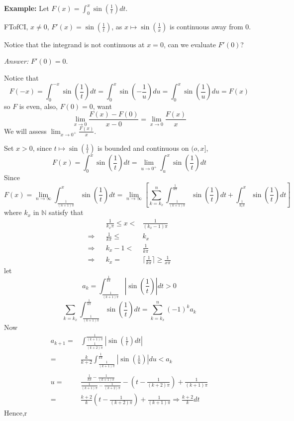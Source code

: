 \documentclass[12pt]{article}
\theoremstyle{plain}
\newcommand{\abs}[1]{\left| #1 \right|}
\newcommand{\ceil}[1]{\lceil #1 \rceil}
\newcommand{\mN}{{\mathbb{N}}}
\begin{document}
{\color{Brown}
\textbf{Example: }
Let $F(x) = \int_0^x \sin(\frac 1t) dt$.

FTofCI, $x \neq 0$, $F'(x) = \sin(\frac 1t)$, as $x\mapsto \sin(\frac 1x)$ is 
continuous away from $0$. 

Notice that the integrand is not continuous at $x = 0$, can we evaluate
$F'(0)$?  

\textit{Answer:} $F'(0) = 0$. 

Notice that 
\[
	F(-x) = \int_0^{-x} \sin (\frac 1t)dt = \int_0^x \sin(-\frac 1u)du
	= \int_0^x \sin(\frac 1u)du = F(x)
\]
so $F$ is even, also, $F(0) = 0$, want 
\[
	\lim_{x\to 0} \frac{F(x) - F(0)}{x-0} 
	= \lim_{x\to 0} \frac{F(x)}x 
\]
We will assess $\lim_{x\to 0^+} \frac{F(x)}x$. 

Set $x > 0$, since $t \mapsto \sin(\frac 1t)$ is bounded and continuous on
$(o,x]$,
\[
	F(x) = \int_0^x \sin(\frac 1t)dt
	= \lim_{u\to 0^+} \int_u^x \sin(\frac 1t)dt
\]
Since 
\[
	F(x) = \lim_{n\to\infty} \int_{\frac1{(n+1)\pi}}^x \sin (\frac 1t)dt 
	= \lim_{n\to\infty}
	\left[
		\sum_{k=k_x}^n \int_{\frac1{(k+1)\pi}}^{\frac 1{k\pi}} 
		\sin(\frac 1t)dt 
		+ 
		\int_{\frac1{k_x\pi}}^x \sin (\frac 1t)dt
	\right]
\]
where $k_x$ in $\mN$ satisfy that 
\begin{align*}
	& &\frac1{k_x\pi} \leq x <& \frac 1{(k_x-1)\pi}	\\
	\Rightarrow &	&\frac 1{k\pi} \leq& k_x	\\
	\Rightarrow &	&k_x - 1 <& \frac 1{k\pi}	\\
	\Rightarrow &	&k_x =& \ceil{\frac1{k\pi}}	\geq \frac1{x\pi}
\end{align*}
let 
\[
	a_k = \int_{\frac1{(k+1)\pi}}^{\frac 1{k\pi}} \abs{\sin(\frac 1t)}dt > 0
\]
\[
	\sum_{k=k_x} \int_{\frac1{(k+1)\pi}}^{\frac 1{k\pi}} \sin(\frac 1t)dt 
	=\sum_{k=k_x}^n (-1)^k a_k
\]
Now 
\begin{align*}
	a_{k+1} 
	=& \int_{\frac1{(k+2)\pi}}^{\frac 1{(k+1)\pi}} \abs{\sin(\frac 1t)dt}	\\
	=& \frac k{k+2} 
	\int_{\frac1{(k+1)\pi}}^{\frac 1{k\pi}} \abs{\sin(\frac 1u)}du< a_k		\\\\
	u =& \frac{\frac1{k\pi}-\frac1{(k+1)\pi}}{\frac1{(k+1)\pi}-\frac1{(k+2)\pi}}
	- (t - \frac 1{(k+2)\pi}) + \frac 1{(k+1)\pi}	\\
	=& \frac{k+2}k (t- \frac1{(k+2)\pi}) + \frac1{(k+1)\pi} 
	\Rightarrow \frac{k+2}k dt
\end{align*}
Hence,r
}


\newpage
\end{document}

